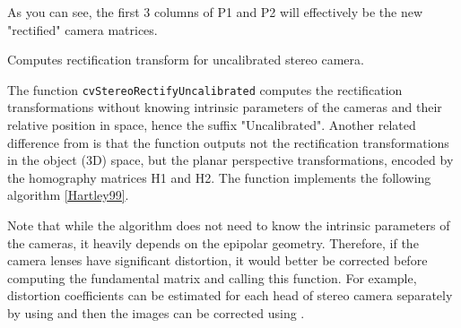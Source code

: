 As you can see, the first 3 columns of P1 and P2 will effectively be the new "rectified" camera matrices. 


Computes rectification transform for uncalibrated stereo camera.


\begin{description}
\end{description}

The function \texttt{cvStereoRectifyUncalibrated} computes the rectification transformations without knowing intrinsic parameters of the cameras and their relative position in space, hence the suffix "Uncalibrated". Another related difference from  is that the function outputs not the rectification transformations in the object (3D) space, but the planar perspective transformations, encoded by the homography matrices H1 and H2. The function implements the following algorithm \href{\#Hartly99}{[Hartley99]}. 

Note that while the algorithm does not need to know the intrinsic parameters of the cameras, it heavily depends on the epipolar geometry. Therefore, if the camera lenses have significant distortion, it would better be corrected before computing the fundamental matrix and calling this function. For example, distortion coefficients can be estimated for each head of stereo camera separately by using  and then the images can be corrected using . 

